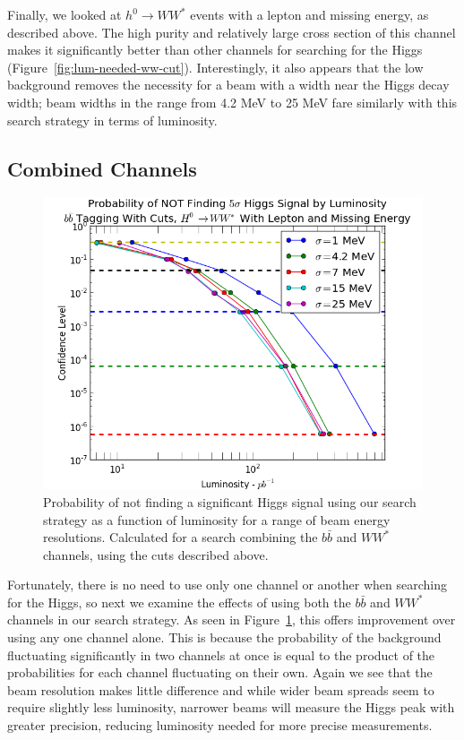 \documentclass[a4paper]{article}
\begin{document}
	Finally, we looked at $h^0 \rightarrow WW^*$ events with a lepton and missing energy, as described above. The high purity and relatively large cross section of this channel makes it significantly better than other channels for searching for the Higgs (Figure~\ref{fig:lum-needed-ww-cut}). Interestingly, it also appears that the low background removes the necessity for a beam with a width near the Higgs decay width; beam widths in the range from 4.2 MeV to 25 MeV fare similarly with this search strategy in terms of luminosity.

	\subsection{Combined Channels}

	\begin{figure}
		\includegraphics[width=\textwidth]{lum-needed-ww-bb}
		\caption{Probability of not finding a significant Higgs signal using our search strategy as a function of luminosity for a range of beam energy resolutions. Calculated for a search combining the $b\bar{b}$ and $WW^*$ channels, using the cuts described above.\label{fig:lum-needed-ww-bb}}
	\end{figure}

	Fortunately, there is no need to use only one channel or another when searching for the Higgs, so next we examine the effects of using both the $b\bar{b}$ and $WW^*$ channels in our search strategy. As seen in Figure~\ref{fig:lum-needed-ww-bb}, this offers improvement over using any one channel alone. This is because the probability of the background fluctuating significantly in two channels at once is equal to the product of the probabilities for each channel fluctuating on their own. Again we see that the beam resolution makes little difference and while wider beam spreads seem to require slightly less luminosity, narrower beams will measure the Higgs peak with greater precision, reducing luminosity needed for more precise measurements. 
\end{document}
